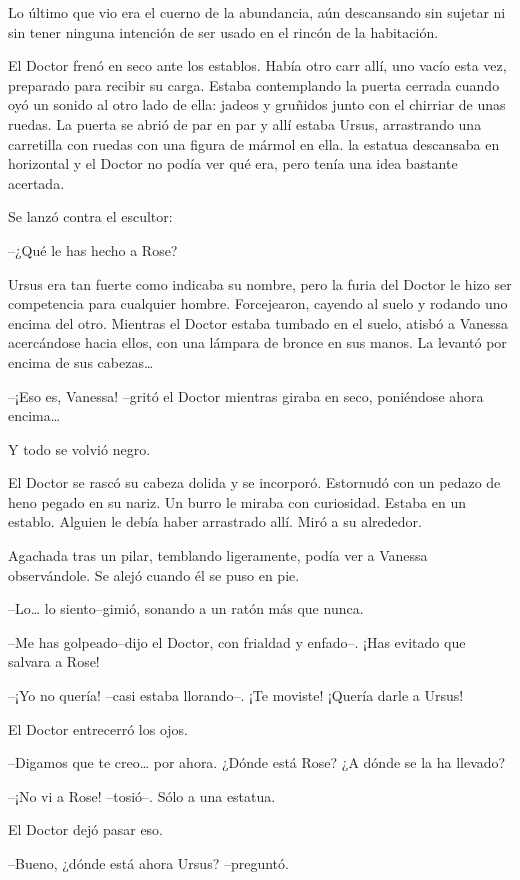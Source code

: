 Lo último que vio era el cuerno de la abundancia, aún descansando sin
sujetar ni sin tener ninguna intención de ser usado en el rincón de la
habitación.

El Doctor frenó en seco ante los establos. Había otro carr allí, uno
vacío esta vez, preparado para recibir su carga. Estaba contemplando la
puerta cerrada cuando oyó un sonido al otro lado de ella: jadeos y
gruñidos junto con el chirriar de unas ruedas. La puerta se abrió de par
en par y allí estaba Ursus, arrastrando una carretilla con ruedas con
una figura de mármol en ella. la estatua descansaba en horizontal y el
Doctor no podía ver qué era, pero tenía una idea bastante acertada.

Se lanzó contra el escultor:

--¿Qué le has hecho a Rose?

Ursus era tan fuerte como indicaba su nombre, pero la furia del Doctor
le hizo ser competencia para cualquier hombre. Forcejearon, cayendo al
suelo y rodando uno encima del otro. Mientras el Doctor estaba tumbado
en el suelo, atisbó a Vanessa acercándose hacia ellos, con una lámpara
de bronce en sus manos. La levantó por encima de sus cabezas\ldots{}

--¡Eso es, Vanessa! --gritó el Doctor mientras giraba en seco,
poniéndose ahora encima\ldots{}

Y todo se volvió negro.

El Doctor se rascó su cabeza dolida y se incorporó. Estornudó con un
pedazo de heno pegado en su nariz. Un burro le miraba con curiosidad.
Estaba en un establo. Alguien le debía haber arrastrado allí. Miró a su
alrededor.

Agachada tras un pilar, temblando ligeramente, podía ver a Vanessa
observándole. Se alejó cuando él se puso en pie.

--Lo\ldots{} lo siento--gimió, sonando a un ratón más que nunca.

--Me has golpeado--dijo el Doctor, con frialdad y enfado--. ¡Has evitado
que salvara a Rose!

--¡Yo no quería! --casi estaba llorando--. ¡Te moviste! ¡Quería darle a
Ursus!

El Doctor entrecerró los ojos.

--Digamos que te creo\ldots{} por ahora. ¿Dónde está Rose? ¿A dónde se
la ha llevado?

--¡No vi a Rose! --tosió--. Sólo a una estatua.

El Doctor dejó pasar eso.

--Bueno, ¿dónde está ahora Ursus? --preguntó.

